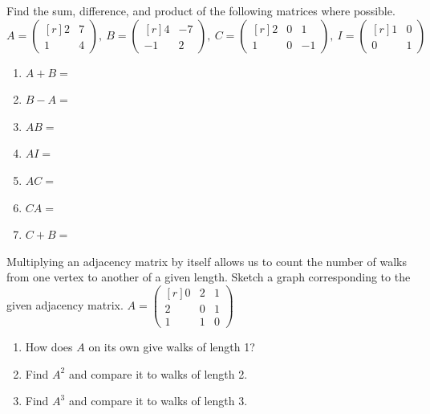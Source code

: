 \begin{practiceprob}
Find the sum, difference, and product of the following matrices where possible.
\begin{equation*}
    A=\begin{pmatrix*}[r]
        2 & 7\\ 1 & 4
    \end{pmatrix*},\ 
    B=\begin{pmatrix*}[r]
        4 & -7\\ -1 & 2
    \end{pmatrix*},\ 
    C=\begin{pmatrix*}[r]
        2 & 0 & 1\\ 1 & 0 & -1
    \end{pmatrix*},\ 
    I=\begin{pmatrix*}[r]
        1 & 0\\ 0 & 1
    \end{pmatrix*}
\end{equation*}
\begin{enumerate}
    \setlength\itemsep{2.3\baselineskip}
    \item \(A+B=\)
    \item \(B-A=\)
    \item \(AB=\)
    \item \(AI=\)
    \item \(AC=\)
    \item \(CA=\)
    \item \(C+B=\)\vspace{2.3\baselineskip}
\end{enumerate}

\end{practiceprob}

\clearpage

\begin{practiceprob}
Multiplying an adjacency matrix by itself allows us to count the number of walks from one vertex to another of a given length.  Sketch a graph corresponding to the given adjacency matrix.\vspace{1\baselineskip}\newline
\(\displaystyle
    A=\begin{pmatrix*}[r]
        0 & 2 & 1\\
        2 & 0 & 1\\
        1 & 1 & 0
    \end{pmatrix*}
\)\vspace{1\baselineskip}
\begin{enumerate}
    \item How does \(A\) on its own give walks of length 1?\vspace{3\baselineskip}
    \item Find \(A^2\) and compare it to walks of length 2.\vspace{3\baselineskip}
    \item Find \(A^3\) and compare it to walks of length 3.\vspace{3\baselineskip}
\end{enumerate}

\end{practiceprob}

